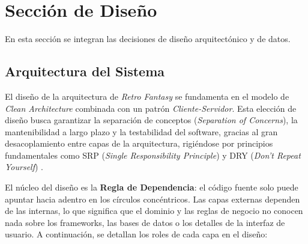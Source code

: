 \section{Sección de Diseño}
\label{sec:seccion_diseno}

En esta sección se integran las decisiones de diseño arquitectónico y de datos.

\subsection{Arquitectura del Sistema}
El diseño de la arquitectura de \textit{Retro Fantasy} se fundamenta en el modelo de \textit{Clean Architecture} \cite{martin_clean_arch} combinada con un patrón \textit{Cliente-Servidor}. Esta elección de diseño busca garantizar la separación de conceptos (\textit{Separation of Concerns}), la mantenibilidad a largo plazo y la testabilidad del software, gracias al gran desacoplamiento entre capas de la arquitectura, rigiéndose por principios fundamentales como SRP (\textit{Single Responsibility Principle}) \cite{martin_agile_solid} y DRY (\textit{Don't Repeat Yourself}) \cite{hunt_pragmatic}.

El núcleo del diseño es la \textbf{Regla de Dependencia}: el código fuente solo puede apuntar hacia adentro en los círculos concéntricos. Las capas externas dependen de las internas, lo que significa que el dominio y las reglas de negocio no conocen nada sobre los frameworks, las bases de datos o los detalles de la interfaz de usuario. A continuación, se detallan los roles de cada capa en el diseño:

